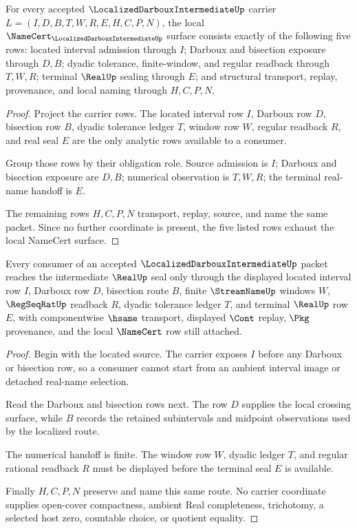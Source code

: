 \begin{theorem}
\label{thm:localized-darboux-intermediate-namecert-obligations}
For every accepted $\LocalizedDarbouxIntermediateUp$ carrier $L=(I,D,B,T,W,R,E,H,C,P,N)$, the local $\NameCert_{\LocalizedDarbouxIntermediateUp}$ surface consists exactly of the following five rows: located interval admission through $I$; Darboux and bisection exposure through $D,B$; dyadic tolerance, finite-window, and regular readback through $T,W,R$; terminal $\RealUp$ sealing through $E$; and structural transport, replay, provenance, and local naming through $H,C,P,N$.
\end{theorem}
\begin{proof}
Project the carrier rows. The located interval row $I$, Darboux row $D$, bisection row $B$, dyadic tolerance ledger $T$, window row $W$, regular readback $R$, and real seal $E$ are the only analytic rows available to a consumer.

Group those rows by their obligation role. Source admission is $I$; Darboux and bisection exposure are $D,B$; numerical observation is $T,W,R$; the terminal real-name handoff is $E$.

The remaining rows $H,C,P,N$ transport, replay, source, and name the same packet. Since no further coordinate is present, the five listed rows exhaust the local NameCert surface.
\end{proof}

\begin{theorem}
\label{thm:localized-darboux-intermediate-bisection-route}
Every consumer of an accepted $\LocalizedDarbouxIntermediateUp$ packet reaches the intermediate $\RealUp$ seal only through the displayed located interval row $I$, Darboux row $D$, bisection route $B$, finite $\StreamNameUp$ windows $W$, $\RegSeqRatUp$ readback $R$, dyadic tolerance ledger $T$, and terminal $\RealUp$ row $E$, with componentwise $\hsame$ transport, displayed $\Cont$ replay, $\Pkg$ provenance, and the local $\NameCert$ row still attached.
\end{theorem}
\begin{proof}
Begin with the located source. The carrier exposes $I$ before any Darboux or bisection row, so a consumer cannot start from an ambient interval image or detached real-name selection.

Read the Darboux and bisection rows next. The row $D$ supplies the local crossing surface, while $B$ records the retained subintervals and midpoint observations used by the localized route.

The numerical handoff is finite. The window row $W$, dyadic ledger $T$, and regular rational readback $R$ must be displayed before the terminal seal $E$ is available.

Finally $H,C,P,N$ preserve and name this same route. No carrier coordinate supplies open-cover compactness, ambient Real completeness, trichotomy, a selected host zero, countable choice, or quotient equality.
\end{proof}

